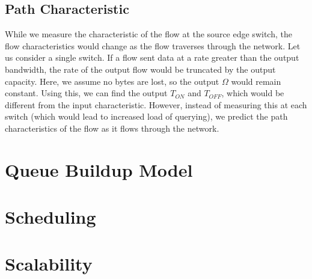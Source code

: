 \subsection{Path Characteristic}
While we measure the characteristic of the flow at the source edge switch, 
the flow characteristics would change as the flow traverses through the network.
Let us consider a single switch. If a flow sent data at a rate greater than the output
bandwidth, the rate of the output flow would be truncated by the output capacity. 
Here, we assume no bytes are lost, so the output $\Omega$ would remain
constant. Using this, we can find the output $T_{ON}$ and $T_{OFF}$, which
would be different from the input characteristic. However, instead of measuring 
this at each switch (which would lead to increased load of querying), we predict
the path characteristics of the flow as it flows through the network. 


\section{Queue Buildup Model}

\section{Scheduling }

\section{Scalability}